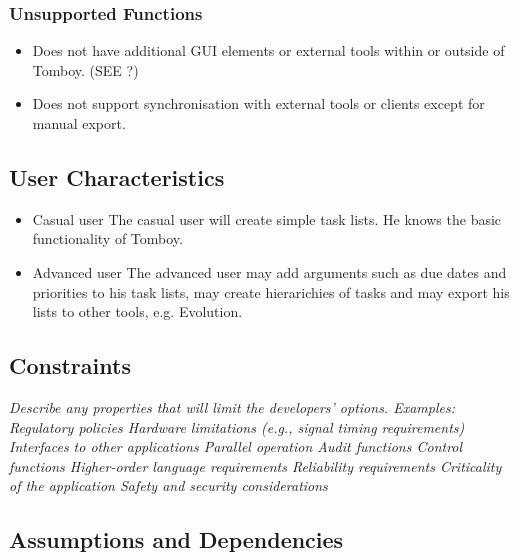 	\subsubsection*{Unsupported Functions}
	\label{description:functions:unsupported}
	\begin{itemize}
		\item Does not have additional GUI elements or external tools within or outside of Tomboy. (SEE ?)
		\item Does not support synchronisation with external tools or clients except for manual export.
	\end{itemize}
	

\subsection{User Characteristics}
\label{description:usercharacteristics}
\begin{itemize}
\item Casual user
The casual user will create simple task lists. He knows the basic functionality of Tomboy.

\item Advanced user
The advanced user may add arguments such as due dates and priorities to his task lists, may create hierarichies of tasks and may export his lists to other tools, e.g. Evolution.
\end{itemize}


\subsection{Constraints}
\label{description:constraints}
\textit{Describe any properties that will limit the developers’ options. Examples:
Regulatory policies
Hardware limitations (e.g., signal timing requirements)
Interfaces to other applications
Parallel operation
Audit functions
Control functions
Higher-order language requirements
Reliability requirements
Criticality of the application
Safety and security considerations}



\subsection{Assumptions and Dependencies}
\label{description:assumptions}

